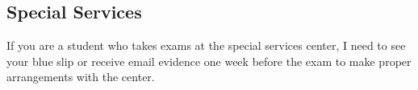 \subsection*{Special Services}

If you are a student who takes exams at the special services center, I need to see your blue slip or receive email evidence one week before the exam to make proper arrangements with the center.